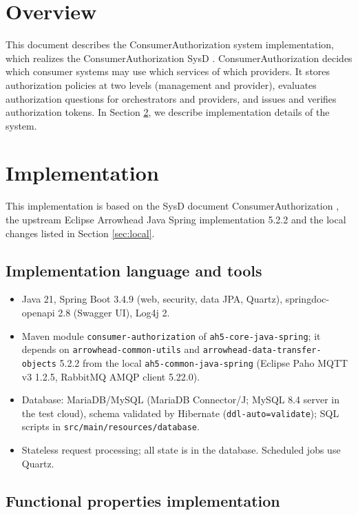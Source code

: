 \documentclass[a4paper]{arrowhead}
\begin{document}
\section{Overview}
\label{sec:overview}

This document describes the ConsumerAuthorization system implementation, which realizes the ConsumerAuthorization SysD \cite{ca-sysd}. Consumer\allowbreak{}Authorization decides which consumer systems may use which services of which providers. It stores authorization policies at two levels (management and provider), evaluates authorization questions for orchestrators and providers, and issues and verifies authorization tokens.
In Section \ref{Implementation}, we describe implementation details of the system.

\newpage

\section{Implementation}
\label{Implementation}

This implementation is based on the SysD document ConsumerAuthorization \cite{ca-sysd}, the upstream Eclipse Arrowhead Java Spring implementation 5.2.2 \cite{ah5java} and the local changes listed in Section \ref{sec:local}.

\subsection{Implementation language and tools}
\begin{itemize}
\item Java 21, Spring Boot 3.4.9 (web, security, data JPA, Quartz), springdoc-openapi 2.8 (Swagger UI), Log4j 2.
\item Maven module \texttt{consumer-authorization} of \texttt{ah5-core-java-spring}; it depends on \texttt{arrowhead-common-utils} and \texttt{arrowhead-data-transfer-objects} 5.2.2 from the local \texttt{ah5-common-java-spring} (Eclipse Paho MQTT v3 1.2.5, RabbitMQ AMQP client 5.22.0).
\item Database: MariaDB/MySQL (MariaDB Connector/J; MySQL 8.4 server in the test cloud), schema validated by Hibernate (\texttt{ddl-auto=validate}); SQL scripts in \texttt{src/main/resources/database}.
\item Stateless request processing; all state is in the database. Scheduled jobs use Quartz.
\end{itemize}

\subsection{Functional properties implementation}
\end{document}
